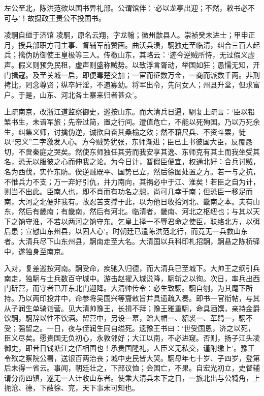 \documentclass[]{article}
\begin{document}
左公至北，陈洪范欲以国书畀礼部。公谓馆伴：`必以龙亭出迎；不然，敕书必不可与'！故摄政王责公不投国书。

凌駉自缢于济馆
凌駉，原名云翔，字龙翰；徽州歙县人。崇祯癸未进士；甲申正月，授兵部职方司主事、督辅军前赞画。曲沃兵溃，駉独走至临清，纠合三百人起兵；擒伪防御使王皇极等三人。传檄山东，其略云：`迹今逆贼所恃，无过假义虚声。假义则预免民租，虚声则盛称贼势。以致浮言胥动，举国如狂；愚懦无知，开门揖寇。及至关城一启，即便毒楚交加；一宦而征数万金，一商而派数千两。非刑拷比，罔念尊贤；纵卒奸淫，不遗寡幼。将军出令，先问女人；州县升堂，但求富户。于是，山东、河北各土寨来归者甚众'。

上疏南京，改浙江道监察御史，巡按山东。而大清兵日逼，駉复上疏言：`臣以铅椠书生，未谙军旅；先帝过简，置之行间。遭值危亡，不能以死殉国。乃以万死余生，纠集义师，讨擒伪逆，诚欲自奋其桑榆之效；然不藉尺兵、不资斗粟，徒以``忠义''二字激发人心。方今贼势犹张，东师渐进；臣已上书彼国大臣，反覆恳切，不啻秦庭之哭矣。然使东师独任其劳而我安享其逸、东师克有其土而我坐受其名，恐无以服彼之心而伸我之论。为今日计，暂假臣便宜，权通北好：合兵讨贼，名为西伐，实作东防。俟逆贼既平、国势已立，然后徐图处置之方。若一与之抗，不惟兵力不支；万一弃好引仇，并力南向，其祸必中于江、淮矣！若臣之自为计，则当不出此。臣南人也，即不肖而有功名之想，尚可几幸于南；但恐臣一移足而南，大河之北便非我有。故忍苦支撑于此，以为他日收拾河北、畿南之本。夫有山东，然后有畿南；有畿南，然后有河北。临清者，畿南、河北之枢纽也；与其以天下之饷守淮，不若以两河之饷守东。乞皇上择一不辱君命之使臣，联络北方，以弭后患；宣慰山东州县，以固人心'。时朝廷已遣陈洪范北行，而竟无一兵救山东者。大清兵尽下山东州县，駉南走至大名。大清国以兵科印札招駉，駉悬之陈桥驿中，遂独身至南京。

入对，复差巡按河南。駉受命，疾驰入归德，而大清兵已至城下。大帅王之纲引兵南走，独駉与士兵数百守城中。游击赵擢入城说降，駉斩之以徇。次日，率兵出西门斫营，而守者已开东北门迎降。大清帅传令：必生致駉。駉自刎，为其麾下所持。乃以两印投井中，命参将吴国兴等齎敕旨并具遗疏入奏。即书一官衔帖，与其从子润生单骑诣营。见大清帅豫王，长揖不拜；豫王雅重駉，命具酒馔，亲持金爵饮駉，駉辞以性不饮酒。留营中，另设一幕，赠大帽一、貂裘一、革舄一，駉不受；强留之。一日，夜与侄润生同自缢死。遗豫王书曰：`世受国恩，济之以死，臣义尽矣。愿贵国无负初心，永敦邻好；大江以南，不必进窥。否则，扬子江头凌御史，即昔日钱塘江之伍相国也！承贵国隆礼，人臣义无私交，谨附缴上'。豫王令殡之察院公署，送银百两治丧；城中吏民皆大哭。駉母年七十岁、子四岁，登第后未得一省云。事闻，朝廷壮之，下部议恤；会国亡，不果。自宏光初立，史督辅请分南四镇，遂无一人计收山东者。使乘大清兵未下之日，一旅北出与公犄角，上扼沧、德，下蔽徐、兖，天下事未可知也。
\end{document}

